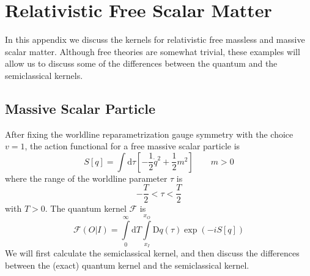 \chapter{Relativistic Free Scalar Matter\label{AppFreeSca}}
In this appendix we discuss the kernels for relativistic free massless and massive scalar matter. Although free theories are somewhat trivial, these examples will allow us to discuss some of the differences between the quantum and the semiclassical kernels.
\section{Massive Scalar Particle}
After fixing the worldline reparametrization gauge symmetry with the choice $v = 1$, the action functional for a free massive scalar particle is
\begin{equation}
	S[q] = \int \mathrm{d}\tau \left[- \frac{1}{2} \dot{q}^{2} + \frac{1}{2}m^{2} \right] \qquad m > 0 \label{SmFree}
\end{equation}
where the range of the worldline parameter $\tau$ is
\begin{equation}
	{- \frac{T}{2} } < \tau < \frac{T}{2}
\end{equation}
with $T > 0$. The quantum kernel $\mathcal{F}$ is
\begin{equation}
	\mathcal{F}(O | I) = \int\limits_{0}^{\infty} \mathrm{d}T \int\limits_{x_{I}}^{x_{O}} \mathrm{D}q(\tau) \exp{\left(- i S[q] \right)}
\end{equation}
We will first calculate the semiclassical kernel, and then discuss the differences between the (exact) quantum kernel and the semiclassical kernel.
